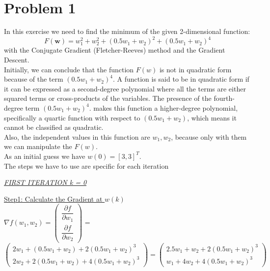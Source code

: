 \section{Problem 1}
In this exercise we need to find the minimum of the given 2-dimensional function:\\
\begin{equation}	
		F(\mathbf{w})=w_{1}^{2}+w_{2}^{2}+(0.5w_{1}+w_{2})^{2}+(0.5w_{1}+w_{2})^{4}	
\end{equation}
\label{eq:function1}
with the Conjugate Gradient (Fletcher-Reeves) method and the Gradient Descent.\\

Initially, we can conclude that the function $F(w)$ is not in quadratic form because of the term $(0.5w_{1}+w_{2})^{4}$.
A function is said to be in quadratic form if it can be expressed as a second-degree polynomial where all the terms are either squared terms or cross-products of the variables. The presence of the fourth-degree term $(0.5w_{1}+w_{2})^{4}$.
makes this function a higher-degree polynomial, specifically a quartic function with respect to $(0.5w_{1}+w_{2})$, which means it cannot be classified as quadratic.\\
Also, the independent values in this function are $w_{1},w_{2}$, because only with them we can manipulate the $F(w)$.\\ 

As an initial guess we have $w\left(0\right) = \left[3, 3\right]^T$.\\
Τhe steps we have to use are specific for each iteration

\begin{center}
	\underline{\textit{FIRST ITERATION k = 0}}
\end{center}

\underline{Step1: Calculate the Gradient at  $w\left(k\right)$ }\\
\(\nabla f(w_1,w_2) = \left(\begin{array}{c}
	\dfrac{\partial f}{\partial w_1} \\[4mm]
	\dfrac{\partial f}{\partial w_2}
\end{array}\right)\) = $\left(\begin{array}{c}
	2w_1 + (0.5w_1+w_2) + 2(0.5w_1+w_2)^3\\[1mm]
	2w_2 + 2(0.5w_1+w_2) + 4(0.5w_1+w_2)^3
\end{array}\right) = \left(\begin{array}{c}
	2.5w_1 + w_2 + 2(0.5w_1+w_2)^3\\[1mm]
	w_1 + 4w_2 + 4(0.5w_1+w_2)^3
\end{array}\right)$ \\[3mm]

